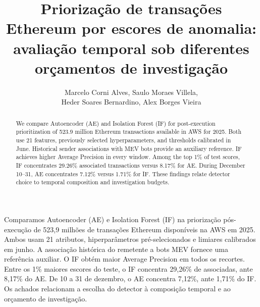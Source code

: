 \documentclass[12pt]{article}
\title{Priorização de transações Ethereum por escores de anomalia:\\avaliação temporal sob diferentes orçamentos de investigação}
\author{Marcelo Corni Alves\inst{1}, Saulo Moraes Villela\inst{1},\\
Heder Soares Bernardino\inst{1}, Alex Borges Vieira\inst{1}}
\begin{document}
\raggedbottom
\maketitle
\begin{abstract}
We compare Autoencoder (AE) and Isolation Forest (IF) for post-execution prioritization of 523.9 million Ethereum transactions available in AWS for 2025. Both use 21 features, previously selected hyperparameters, and thresholds calibrated in June. Historical sender associations with MEV bots provide an auxiliary reference. IF achieves higher Average Precision in every window. Among the top 1\% of test scores, IF concentrates 29.26\% associated transactions versus 8.17\% for AE. During December 10--31, AE concentrates 7.12\% versus 1.71\% for IF. These findings relate detector choice to temporal composition and investigation budgets.
\end{abstract}
\begin{resumo}
Comparamos Autoencoder (AE) e Isolation Forest (IF) na priorização pós-execução de 523,9 milhões de transações Ethereum disponíveis na AWS em 2025. Ambos usam 21 atributos, hiperparâmetros pré-selecionados e limiares calibrados em junho. A associação histórica do remetente a bots MEV fornece uma referência auxiliar. O IF obtém maior Average Precision em todos os recortes. Entre os 1\% maiores escores do teste, o IF concentra 29,26\% de associadas, ante 8,17\% do AE. De 10 a 31 de dezembro, o AE concentra 7,12\%, ante 1,71\% do IF. Os achados relacionam a escolha do detector à composição temporal e ao orçamento de investigação.
\end{resumo}






\label{fimconteudo}

\begingroup
{}

\endgroup
\end{document}
